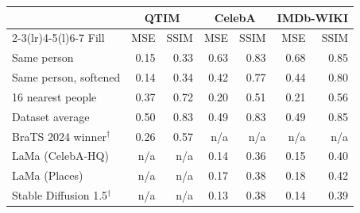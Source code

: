 \begin{tabular}{@{}lrrrrrr@{}}
\toprule
 & \multicolumn{2}{c}{QTIM} & \multicolumn{2}{c}{CelebA} & \multicolumn{2}{c}{IMDb-WIKI} \\
\cmidrule(lr){2-3}\cmidrule(lr){4-5}\cmidrule(l){6-7}
Fill & \acs{MSE} & \acs{SSIM} & \acs{MSE} & \acs{SSIM} & \acs{MSE} & \acs{SSIM} \\
\midrule
Same person & 0.15 & 0.33 & 0.63 & 0.83 & 0.68 & 0.85 \\
Same person, softened & 0.14 & 0.34 & 0.42 & 0.77 & 0.44 & 0.80 \\
16 nearest people & 0.37 & 0.72 & 0.20 & 0.51 & 0.21 & 0.56 \\
Dataset average & 0.50 & 0.83 & 0.49 & 0.83 & 0.49 & 0.85 \\
\midrule
BraTS 2024 winner$^{\dagger}$ & 0.26 & 0.57 & n/a & n/a & n/a & n/a \\
LaMa (CelebA-HQ) & n/a & n/a & 0.14 & 0.36 & 0.15 & 0.40 \\
LaMa (Places) & n/a & n/a & 0.17 & 0.38 & 0.18 & 0.42 \\
Stable Diffusion 1.5$^{\dagger}$ & n/a & n/a & 0.13 & 0.38 & 0.14 & 0.39 \\
\bottomrule
\end{tabular}

